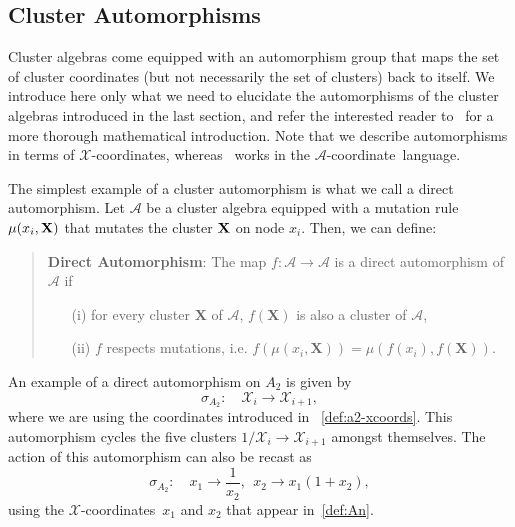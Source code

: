 \documentclass[11pt]{article}
\def\x{\mathcal{X}}
\def\xcoords{$\mathcal{X}$-coordinates}
\def\a{\mathcal{A}}
\def\acoord{$\mathcal{A}$-coordinate}
\begin{document}

\subsection{Cluster Automorphisms}\label{sec:automorphisms}

Cluster algebras come equipped with an automorphism group that maps the set of cluster coordinates (but not necessarily the set of clusters) back to itself. We introduce here only what we need to elucidate the automorphisms of the cluster algebras introduced in the last section, and refer the interested reader to~\cite{Chang:2015} for a more thorough mathematical introduction. Note that we describe automorphisms in terms of \xcoords, whereas~\cite{Chang:2015} works in the \acoord\ language. 

The simplest example of a cluster automorphism is what we call a direct automorphism. Let $\a$ be a cluster algebra equipped with a mutation rule $\mu(x_i, \bf{X})$ that mutates the cluster $\bf{X}$ on node $x_i$. Then, we can define:
\begin{quote}
{\bf Direct Automorphism}: The map $f: \a \to \a$ is a direct automorphism of $\a$ if 
\vspace{-.2cm}
 \begin{itemize}
 \item[(i)] for every cluster $\mathbf{X}$ of $\a$, $f(\mathbf{X})$ is also a cluster of $\a$, 
 \item[(ii)] $f$ respects mutations, i.e. $f(\mu(x_i,\mathbf{X})) = \mu(f(x_i),f(\mathbf{X}))$.
 \end{itemize}
\end{quote}
An example of a direct automorphism on $A_2$ is given by
\begin{equation}
  \sigma_{A_2}:\quad \mathcal{X}_i \to \mathcal{X}_{i+1},
\end{equation}
where we are using the coordinates introduced in ~\eqref{def:a2-xcoords}. This automorphism cycles the five clusters $1/\x_i\to \x_{i+1}$ amongst themselves. The action of this automorphism can also be recast as
\begin{equation}
  \sigma_{A_2}:\quad x_1\to \frac{1}{x_2},~~ x_2\to x_1(1+x_2),
\end{equation}
using the \xcoords\ $x_1$ and $x_2$ that appear in~\eqref{def:An}. 
\end{document}
